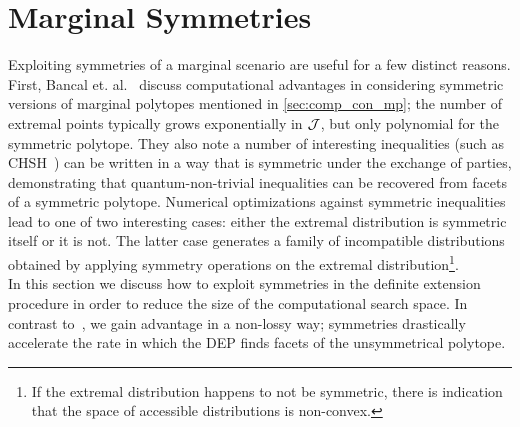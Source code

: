 \documentclass[aps, 10pt, english, twoside, pra, nofootinbib, longbibliography]{revtex4-1}
\begin{document}
    \section{Marginal Symmetries}
    \label{sec:symmetry}
    Exploiting symmetries of a marginal scenario are useful for a few distinct reasons. First, Bancal et. al.~\cite{Bancal_2010} discuss computational advantages in considering symmetric versions of marginal polytopes mentioned in \cref{sec:comp_con_mp}; the number of extremal points typically grows exponentially in $\mathcal{J}$, but only polynomial for the symmetric polytope. They also note a number of interesting inequalities (such as CHSH~\cite{CHSH_Original}) can be written in a way that is symmetric under the exchange of parties, demonstrating that quantum-non-trivial inequalities can be recovered from facets of a symmetric polytope. Numerical optimizations against symmetric inequalities lead to one of two interesting cases: either the extremal distribution is symmetric itself or it is not. The latter case generates a family of incompatible distributions obtained by applying symmetry operations on the extremal distribution\footnote{If the extremal distribution happens to not be symmetric, there is indication that the space of accessible distributions is non-convex.}.\\

    In this section we discuss how to exploit symmetries in the definite extension procedure in order to reduce the size of the computational search space. In contrast to~\cite{Bancal_2010}, we gain advantage in a non-lossy way; symmetries drastically accelerate the rate in which the DEP finds facets of the unsymmetrical polytope. \\
\end{document}
